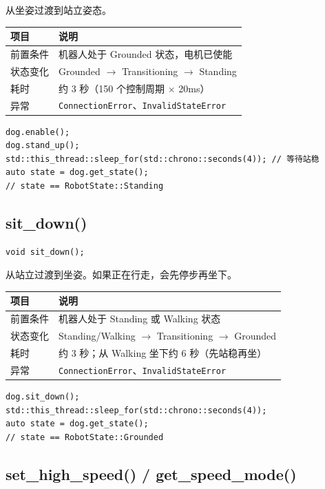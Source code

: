 \documentclass[a4paper,11pt,openany]{book}
\begin{document}
从坐姿过渡到站立姿态。

\begin{longtable}{ll}
\toprule
项目 & 说明 \\
\midrule
\endhead
前置条件 & 机器人处于 Grounded 状态，电机已使能 \\
状态变化 & Grounded $\to$ Transitioning $\to$ Standing \\
耗时 & 约 3 秒（150 个控制周期 $\times$ 20ms）\\
异常 & \texttt{ConnectionError}、\texttt{InvalidStateError} \\
\bottomrule
\end{longtable}

\begin{lstlisting}[style=cpp]
dog.enable();
dog.stand_up();
std::this_thread::sleep_for(std::chrono::seconds(4)); // 等待站稳
auto state = dog.get_state();
// state == RobotState::Standing
\end{lstlisting}

\subsection{sit\_down()}

\begin{lstlisting}[style=cpp,numbers=none]
void sit_down();
\end{lstlisting}

从站立过渡到坐姿。如果正在行走，会先停步再坐下。

\begin{longtable}{ll}
\toprule
项目 & 说明 \\
\midrule
\endhead
前置条件 & 机器人处于 Standing 或 Walking 状态 \\
状态变化 & Standing/Walking $\to$ Transitioning $\to$ Grounded \\
耗时 & 约 3 秒；从 Walking 坐下约 6 秒（先站稳再坐）\\
异常 & \texttt{ConnectionError}、\texttt{InvalidStateError} \\
\bottomrule
\end{longtable}

\begin{lstlisting}[style=cpp]
dog.sit_down();
std::this_thread::sleep_for(std::chrono::seconds(4));
auto state = dog.get_state();
// state == RobotState::Grounded
\end{lstlisting}

\subsection{set\_high\_speed() / get\_speed\_mode()}
\end{document}
